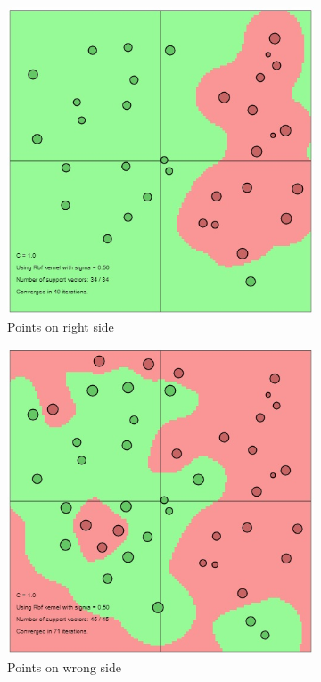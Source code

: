 \documentclass[12pt]{report}
\begin{document}
{     
	\begin{figure}[ht] 
		\centering
	 	\begin{subfigure}{.3\textwidth}
	 		\centering
	 		\includegraphics[width=.7\linewidth]{RBF_kernel_1.jpg}
	 		\caption{Points on right side}
	 		\label{fig:rbf1}
	 	\end{subfigure}
		 \begin{subfigure}{.3\textwidth}
	 		\centering
	 		\includegraphics[width=.7\linewidth]{RBF_kernel_2.jpg}
	 		\caption{Points on wrong side}
	 		\label{fig:rbf2}
	 	\end{subfigure}
	 	\begin{subfigure}{.3\textwidth}
 			\centering

\end{subfigure}
\end{figure}}
\end{document}
